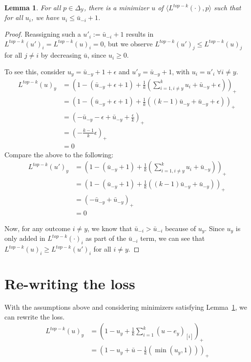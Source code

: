 \documentclass[12pt]{article}
\newcommand{\ubar}{\bar{u}}
\newcommand{\simplex}{\Delta_\Y}
\newcommand{\Y}{\mathcal{Y}}
\newcommand{\inprod}[2]{\langle #1, #2 \rangle}%
\newcommand{\Ind}[1]{\mathbf{1}\{#1\}}
\newtheorem{lemma}{Lemma}
\begin{document}
\begin{lemma}\label{lem:top-threshold}
	For all $p \in \simplex$, there is a minimizer $u$ of $\inprod{L^{top-k}(\cdot)}{p}$ such that for all $u_i$, we have $u_i \leq \bar u_{-i} +1$. 
\end{lemma}
\begin{proof}
	Reassigning such a $u'_i := \bar u_{-i} +1$ results in $L^{top-k}(u')_i = L^{top-k}(u)_i = 0$, but we observe $L^{top-k}(u')_j \leq L^{top-k}(u)_j$ for all $j \neq i$ by decreasing $\ubar$, since $u_i \geq 0$.

To see this, consider $u_y = \bar u_{-y} + 1 + \epsilon$ and $u'_y = \bar u_{-y} + 1$, with $u_i = u'_i \; \forall i \neq y$. 
\begin{align*}
L^{top-k}(u)_y &= \left(1 - (\bar u_{-y} + \epsilon + 1) + \frac 1 k \left(\sum_{i=1, i \neq y}^k u_i + \bar u_{-y} + \epsilon\right) \right)_+\\ 
&= \left(1 - (\bar u_{-y} + \epsilon + 1) + \frac 1 k \left((k-1) \bar u_{-y} + \bar u_{-y} + \epsilon\right) \right)_+\\
&= \left(-\bar u_{-y} - \epsilon + \bar u_{-y} + \frac \epsilon k \right)_+ \\
&= (-\frac{k-1}{k}\epsilon)_+\\
&= 0
\end{align*}
Compare the above to the following:
\begin{align*}
L^{top-k}(u')_y &= \left(1 - (\bar u_{-y} + 1) + \frac 1 k \left(\sum_{i=1, i \neq y}^k u_i + \bar u_{-y} \right) \right)_+\\ 
&= \left(1 - (\bar u_{-y} + 1) + \frac 1 k \left((k-1) \bar u_{-y} + \bar u_{-y} \right) \right)_+\\
&= \left(-\bar u_{-y} + \bar u_{-y}\right)_+ \\
&= 0
\end{align*}

Now, for any outcome $i \neq y$, we know that $\bar u_{-i} > \bar u_{-i}$ because of $u_y$.
Since $u_y$ is only added in $L^{top-k}(\cdot)_i$ as part of the $\bar u_{-i}$ term, we can see that $L^{top-k}(u)_i \geq L^{top-k}(u')_i$ for all $i \neq y$.
\end{proof}

\section{Re-writing the loss}


With the assumptions above and considering minimizers satisfying Lemma~\ref{lem:top-threshold}, we can rewrite the loss.
\begin{align*} 
L^{top-k}(u)_y&=\left(1 - u_y + \frac{1}{k} \sum_{i=1}^k (u - e_y)_{[i]} \right)_+\\
&=\left(1 - u_y + \bar u - \frac{1}{k}(\min(u_y, 1)) \right)_+
\end{align*}
\end{document}
